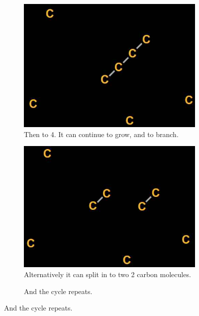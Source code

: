 \documentclass[]{article}
\begin{document}
\begin{figure}[H]
\begin{subfigure}[h]{0.45\textwidth}
	\end{subfigure}
	\begin{subfigure}[h]{0.45\textwidth}
		\caption{Then to 4. It can continue to grow, and to branch.}
		\includegraphics[width=\textwidth]{FormoseStep3}
	\end{subfigure}
	\begin{subfigure}[h]{0.45\textwidth}
		\caption{Alternatively it can split in to two 2 carbon molecules.}
		\includegraphics[width=\textwidth]{FormoseStep4}
	\end{subfigure}
	\begin{subfigure}[h]{0.45\textwidth}
		\caption{And the cycle repeats.}

\end{subfigure}
\end{figure}
\end{document}
